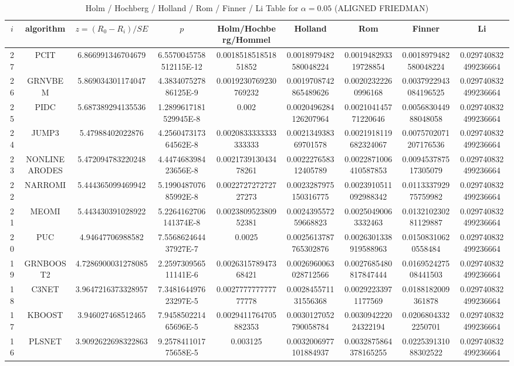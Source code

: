 \documentclass[a4paper,10pt]{article}
\begin{document}
\begin{landscape}
\begin{table}[!htp]
\centering\scriptsize
\caption{Holm / Hochberg / Holland / Rom / Finner / Li Table for $\alpha=0.05$ (ALIGNED FRIEDMAN)}
\begin{tabular}{ccccccccc}
$i$&algorithm&$z=(R_0 - R_i)/SE$&$p$&Holm/Hochberg/Hommel&Holland&Rom&Finner&Li\\
\hline
27&PCIT&6.866991346704679&6.5570045758512115E-12&0.001851851851851852&0.0018979482580048224&0.001948293319728854&0.0018979482580048224&0.029740832499236664\\
26&GRNVBEM&5.869034301174047&4.383407527886125E-9&0.0019230769230769232&0.0019708742865489626&0.00202322260996168&0.0037922943084196525&0.029740832499236664\\
25&PIDC&5.687389294135536&1.2899617181529945E-8&0.002&0.0020496284126207964&0.002104145771220646&0.005683044988048058&0.029740832499236664\\
24&JUMP3&5.47988402022876&4.256047317364562E-8&0.0020833333333333333&0.002134938369701578&0.0021918119682324067&0.0075702071207176536&0.029740832499236664\\
23&NONLINEARODES&5.472094783220248&4.447468398423656E-8&0.002173913043478261&0.002227658312405789&0.0022871006410587853&0.009453787517305079&0.029740832499236664\\
22&NARROMI&5.444365099469942&5.199048707685992E-8&0.002272727272727273&0.0023287975150316775&0.0023910511092988342&0.011333792975759982&0.029740832499236664\\
21&MEOMI&5.443430391028922&5.2264162706141374E-8&0.002380952380952381&0.002439557259668823&0.00250490063332463&0.013210230281129887&0.029740832499236664\\
20&PUC&4.94647706988582&7.556862464437927E-7&0.0025&0.0025613787765302876&0.0026301338919588963&0.01508310620558484&0.029740832499236664\\
19&GRNBOOST2&4.7286900031278085&2.259730956511141E-6&0.002631578947368421&0.0026960063028712566&0.0027685480817847444&0.016952427508441503&0.029740832499236664\\
18&C3NET&3.9647216373328957&7.348164497623297E-5&0.002777777777777778&0.002845571131556368&0.00292233971177569&0.0188182009361878&0.029740832499236664\\
17&KBOOST&3.946027468512465&7.945850221465696E-5&0.0029411764705882353&0.0030127052790058784&0.003094222024322194&0.02068043322250701&0.029740832499236664\\
16&PLSNET&3.9092622698322863&9.257841101775658E-5&0.003125&0.0032006977101884937&0.0032875864378165255&0.022539131088302522&0.029740832499236664\\

\end{tabular}
\end{table}
\end{landscape}
\end{document}

